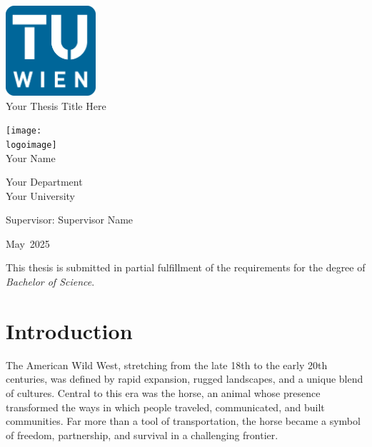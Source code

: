 \documentclass[11pt]{report}
\newcommand{\thesistitle}{Your Thesis Title Here}
\newcommand{\authorname}{Your Name}
\newcommand{\supervisor}{Supervisor Name}
\newcommand{\institution}{Your University}
\newcommand{\department}{Your Department}
\newcommand{\logoimage}{graphics/logo.png} %
\newcommand{\submissionmonth}{May}
\newcommand{\submissionyear}{2025}
\begin{document}
\begin{titlepage}
    \centering
    \vspace*{1cm}
    
    \includegraphics[width=0.25\textwidth]{graphics/tuWienLogo.png}
    \\[1cm]
    
    {\Huge \thesistitle\\[1.5cm]}

    \texttt{[image: \\logoimage]}\\[1cm]

    {\Large \authorname\\[0.5cm]}
  
    {\large \department\\
    \institution\\[1.5cm]}
  
    {\large Supervisor: \supervisor\\[2cm]}
  
    {\large \submissionmonth~\submissionyear\\}
  
    \vfill
  
    \vspace*{0.5cm}
    {\small This thesis is submitted in partial fulfillment of the requirements for the degree of \textit{Bachelor of Science}.}
  
  \end{titlepage}

\chapter{Introduction}
The American Wild West, stretching from the late 18th to the early 20th centuries, was defined by rapid expansion, rugged landscapes, and a unique blend of cultures. Central to this era was the horse, an animal whose presence transformed the ways in which people traveled, communicated, and built communities. Far more than a tool of transportation, the horse became a symbol of freedom, partnership, and survival in a challenging frontier.
\end{document}
